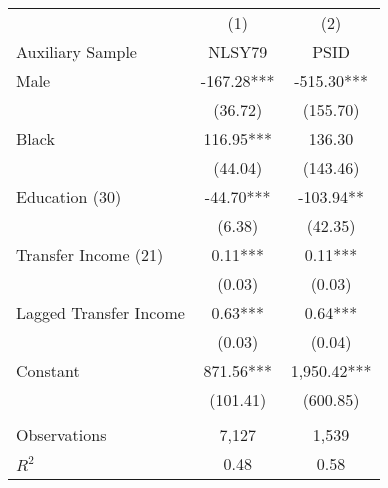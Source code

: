 \begin{tabular}{lcc} \toprule
 & (1) & (2)   \\
Auxiliary Sample & NLSY79 & PSID  \\  \midrule 
Male & -167.28*** & -515.30*** \\
 & (36.72) & (155.70) \\
Black & 116.95*** & 136.30  \\
 & (44.04)  & (143.46)  \\
Education (30) & -44.70*** & -103.94** \\
 & (6.38)  & (42.35) \\
Transfer Income (21) & 0.11***  & 0.11***   \\
 & (0.03)   & (0.03)   \\
Lagged Transfer Income & 0.63***  & 0.64***   \\
 & (0.03)   & (0.04)   \\
Constant & 871.56***   & 1,950.42***   \\
 & (101.41)  & (600.85)   \\ \\ \midrule
Observations & 7,127   & 1,539   \\
$R^2$  & 0.48   & 0.58   \\ \bottomrule
\end{tabular}
